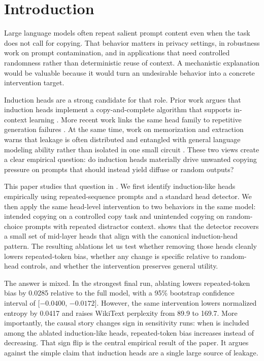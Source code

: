 \section{Introduction}
\label{sec:introduction}

Large language models often repeat salient prompt content even when the task does not call for copying. That behavior matters in privacy settings, in robustness work on prompt contamination, and in applications that need controlled randomness rather than deterministic reuse of context. A mechanistic explanation would be valuable because it would turn an undesirable behavior into a concrete intervention target.

Induction heads are a strong candidate for that role. Prior work argues that induction heads implement a copy-and-complete algorithm that supports in-context learning \cite{olsson2022induction, crosbie2024induction, ren2024semantic}. More recent work links the same head family to repetitive generation failures \cite{wang2025toxicity}. At the same time, work on memorization and extraction warns that leakage is often distributed and entangled with general language modeling ability rather than isolated in one small circuit \cite{lee2022deduplicating, ippolito2022falseprivacy, huang2024memorization}. These two views create a clear empirical question: do induction heads materially drive unwanted copying pressure on prompts that should instead yield diffuse or random outputs?

This paper studies that question in \gptsmall. We first identify induction-like heads empirically using repeated-sequence prompts and a standard head detector. We then apply the same head-level intervention to two behaviors in the same model: intended copying on a controlled copy task and unintended copying on random-choice prompts with repeated distractor context.  shows that the detector recovers a small set of mid-layer heads that align with the canonical induction-head pattern. The resulting ablations let us test whether removing those heads cleanly lowers repeated-token bias, whether any change is specific relative to random-head controls, and whether the intervention preserves general utility.

The answer is mixed. In the strongest final run, ablating \headpair lowers repeated-token bias by 0.0285 relative to the full model, with a 95\% bootstrap confidence interval of [$-0.0400$, $-0.0172$]. However, the same intervention lowers normalized entropy by 0.0417 and raises WikiText perplexity from 89.9 to 169.7. More importantly, the causal story changes sign in sensitivity runs: when \headlsix is included among the ablated induction-like heads, repeated-token bias increases instead of decreasing. That sign flip is the central empirical result of the paper. It argues against the simple claim that induction heads are a single large source of leakage.

